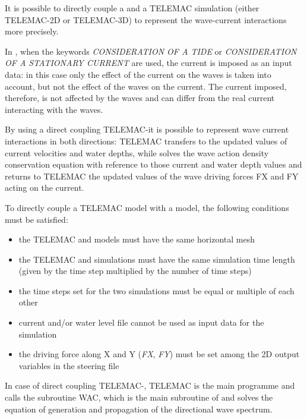 It is possible to directly couple a \tomawac and a TELEMAC simulation (either TELEMAC-2D or TELEMAC-3D) to represent the wave-current
interactions more precisely.

In \tomawac, when the keywords \textit{CONSIDERATION OF A TIDE} or \textit{CONSIDERATION OF A STATIONARY CURRENT} are used, the current
is imposed as an input data: in this case only the effect of the current on the waves is taken into account, but not the effect of the
waves on the current. The current imposed, therefore, is not affected by the waves and can differ from the real current interacting
with the waves.

By using a direct coupling TELEMAC-\tomawac it is possible to represent wave current interactions in both directions: TELEMAC transfers
to \tomawac the updated values of current velocities and water depths, while \tomawac solves the wave action density conservation
equation with reference to those current and water depth values and returns to TELEMAC the updated values of the wave driving forces
FX and FY acting on the current.

 To directly couple a TELEMAC model with a \tomawac model, the following conditions must be satisfied:

\begin{itemize}
\item  the TELEMAC and \tomawac models must have the same horizontal mesh

\item  the TELEMAC and \tomawac simulations must have the same simulation time length (given by the time step multiplied by the number
  of time steps)

\item  the time steps set for the two simulations must be equal or multiple of each other

\item  current and/or water level file cannot be used as input data for the \tomawac simulation

\item  the driving force along X and Y (\textit{FX}, \textit{FY}) must be set among the 2D output variables in the steering file
\end{itemize}

In case of direct coupling TELEMAC-\tomawac, TELEMAC is the main programme and calls the \tomawac subroutine WAC, which is the main
subroutine of \tomawac and solves the equation of generation and propagation of the directional wave spectrum.

